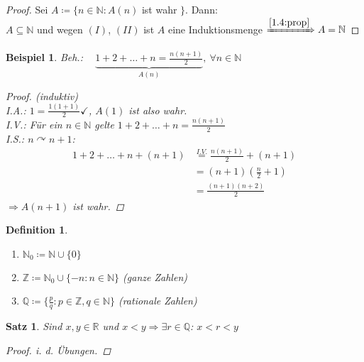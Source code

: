 \documentclass[14pt,titlepage,ngerman,a4paper,headsepline,DIV15,halfparskip*]{scrartcl}
\newcommand{\N}{\mathbb{N}}
\newcommand{\Q}{\mathbb{Q}}
\newcommand{\R}{\mathbb{R}}
\newcommand{\Z}{\mathbb{Z}}
\theoremstyle{named}
\theoremstyle{dotless}
\newtheorem{satz}[namedtheorem]{Satz}
\newtheorem*{beispiel*}{Beispiel}
\newtheorem*{definition}{Definition}
\begin{document}
\begin{proof}
	Sei $A \coloneqq \{ n \in \N : A(n)$ ist wahr $\}$. Dann: \\
	$A \subseteq \N$ und wegen $(I)$, $(II)$ ist $A$ eine Induktionsmenge $\xRightarrow[]{\ref{1.4:prop}} A = \N$
\end{proof}


\begin{beispiel*}
	Beh.: ~ $\underbrace{1 + 2 + \dotsc + n = \frac{n (n + 1)}{2}}_{A(n)}, ~\forall n \in \N$
	
	\begin{proof}(induktiv) \\
		I.A.: $1 = \frac{1 (1 + 1)}{2} \checkmark$, $A(1)$ ist also wahr. \\
		I.V.: Für ein $n \in \N$ gelte $1 + 2 + \dotsc + n = \frac{n (n + 1)}{2}$ \\
		I.S.: $n \curvearrowright n + 1$: 
		\begin{align*}
			1 + 2 + \dotsc + n + (n + 1) & \overset{I.V.}{=}  \frac{n (n + 1)}{2} + (n + 1) \\
									 	 & = (n + 1) \left( \frac{n}{2} + 1 \right) \\
									 	 & = \frac{(n + 1)(n + 2)}{2}
		\end{align*}
		$\Rightarrow A(n + 1)$ ist wahr.
	\end{proof}
\end{beispiel*}

 
\begin{definition} ~\
	\begin{enumerate}
		\item $\N_{0} \coloneqq \N \cup \{ 0 \}$
		\item $\Z \coloneqq \N_{0} \cup \{ - n : n \in \N \}$ (ganze Zahlen)
		\item $\Q \coloneqq \{ \frac{p}{q} : p \in \Z, q \in \N \}$ (rationale Zahlen)
	\end{enumerate}
\end{definition}


\begin{satz} \label{1.5:satz}
	Sind $x, y \in \R$ und $x < y \Rightarrow \exists r \in \Q$: $x < r < y$	

	\begin{proof}
		i. d. Übungen.
	\end{proof}
\end{satz}

   
\end{document}
